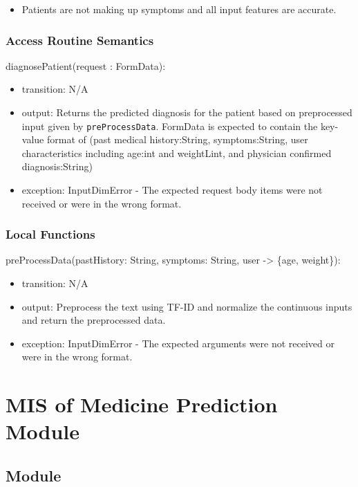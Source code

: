 \documentclass[12pt, titlepage]{article}
\begin{document}
\begin{itemize}
  \item Patients are not making up symptoms and all input features are accurate.
\end{itemize}

\subsubsection{Access Routine Semantics}

\noindent diagnosePatient(request : FormData):
\begin{itemize}
\item transition: N/A
\item output: Returns the predicted diagnosis for the patient based on preprocessed input given by \texttt{preProcessData}. FormData is expected to contain the key-value format of (past medical history:String, symptoms:String, user characteristics including age:int and weightLint, and physician confirmed diagnosis:String)
\item exception: InputDimError - The expected request body items were not received or were in the wrong format.
\end{itemize}

\subsubsection{Local Functions}

\noindent preProcessData(pastHistory: String, symptoms: String, user -> \{age, weight\}):
\begin{itemize}
\item transition: N/A
\item output: Preprocess the text using TF-ID and normalize the continuous inputs and return the preprocessed data.
\item exception: InputDimError - The expected arguments were not received or were in the wrong format.
\end{itemize}

\newpage
  
\section{MIS of Medicine Prediction Module} \label{med_pred_mod}


\subsection{Module}
\end{document}
